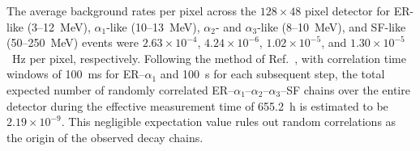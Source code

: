\documentclass[final,5p,times,twocolumn,number,sort&compress]{elsarticle}
\begin{document}
The average background rates per pixel across the $128\times48$ pixel
detector for ER-like (3--12~MeV), $\alpha_1$-like (10--13~MeV),
$\alpha_2$- and $\alpha_3$-like (8--10~MeV), and SF-like
(50--250~MeV) events were $2.63\times10^{-4}$,
$4.24\times10^{-6}$, $1.02\times10^{-5}$, and
$1.30\times10^{-5}$~Hz per pixel, respectively.
Following the method of Ref.~\cite{schmidtRemarksErrorAnalysis1984a},
with correlation time windows of 100~ms for ER--$\alpha_1$
and 100~s for each subsequent step, the total expected number of
randomly correlated ER--$\alpha_1$--$\alpha_2$--$\alpha_3$--SF
chains over the entire detector during the effective measurement
time of 655.2~h is estimated to be $2.19\times10^{-9}$.
This negligible expectation value rules out random correlations as the origin of the observed decay chains.


\end{document}
